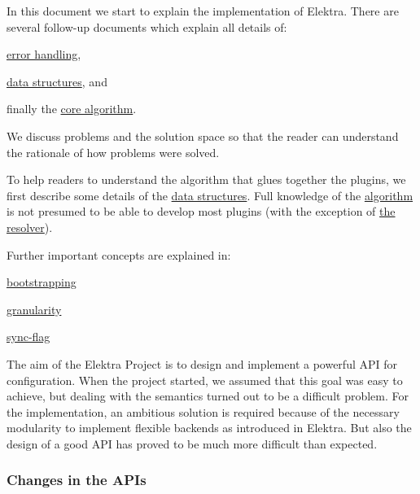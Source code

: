 In this document we start to explain the implementation of Elektra. There are several follow-\/up documents which explain all details of\+:


\begin{DoxyItemize}
\item \hyperlink{md_doc_help_elektra-error-handling_doc_help_elektra-error-handling_md}{error handling},
\item \hyperlink{md_doc_help_elektra-data-structures_doc_help_elektra-data-structures_md}{data structures}, and
\item finally the \hyperlink{md_doc_help_elektra-algorithm_doc_help_elektra-algorithm_md}{core algorithm}.
\end{DoxyItemize}

We discuss problems and the solution space so that the reader can understand the rationale of how problems were solved.

To help readers to understand the algorithm that glues together the plugins, we first describe some details of the \hyperlink{md_doc_help_elektra-data-structures_doc_help_elektra-data-structures_md}{data structures}. Full knowledge of the \hyperlink{md_doc_help_elektra-algorithm_doc_help_elektra-algorithm_md}{algorithm} is not presumed to be able to develop most plugins (with the exception of \hyperlink{md_src_plugins_resolver_README_src_plugins_resolver_README_md}{the resolver}).

Further important concepts are explained in\+:


\begin{DoxyItemize}
\item \hyperlink{md_doc_help_elektra-bootstrapping_doc_help_elektra-bootstrapping_md}{bootstrapping}
\item \hyperlink{doc_help_elektra-granularity_md}{granularity}
\item \hyperlink{doc_help_elektra-sync-flag_md}{sync-\/flag}
\end{DoxyItemize}

The aim of the Elektra Project is to design and implement a powerful A\+P\+I for configuration. When the project started, we assumed that this goal was easy to achieve, but dealing with the semantics turned out to be a difficult problem. For the implementation, an ambitious solution is required because of the necessary modularity to implement flexible backends as introduced in Elektra. But also the design of a good A\+P\+I has proved to be much more difficult than expected.

\subsubsection*{Changes in the A\+P\+Is}

